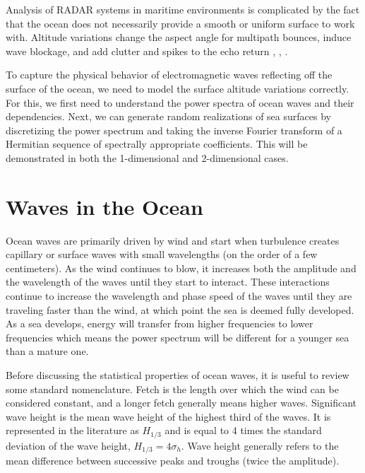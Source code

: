 Analysis of RADAR systems in maritime environments is complicated by the fact that the ocean does not necessarily provide a smooth or uniform surface to work with. Altitude variations change the aspect angle for multipath bounces, induce wave blockage, and add clutter and spikes to the echo return \cite{skolnik_handbook}, \cite{blake_radar}, \cite{nathanson_radar}.

To capture the physical behavior of electromagnetic waves reflecting off the surface of the ocean, we need to model the surface altitude variations correctly. For this, we first need to understand the power spectra of ocean waves and their dependencies. Next, we can generate random realizations of sea surfaces by discretizing the power spectrum and taking the inverse Fourier transform of a Hermitian sequence of spectrally appropriate coefficients. This will be demonstrated in both the 1-dimensional and 2-dimensional cases.

\section {Waves in the Ocean}
Ocean waves are primarily driven by wind and start when turbulence creates capillary or surface waves with small wavelengths (on the order of a few centimeters). As the wind continues to blow, it increases both the amplitude and the wavelength of the waves until they start to interact. These interactions continue to increase the wavelength and phase speed of the waves until they are traveling faster than the wind, at which point the sea is deemed fully developed. As a sea develops, energy will transfer from higher frequencies to lower frequencies which means the power spectrum will be different for a younger sea than a mature one.

Before discussing the statistical properties of ocean waves, it is useful to review some standard nomenclature. Fetch is the length over which the wind can be considered constant, and a longer fetch generally means higher waves. Significant wave height is the mean wave height of the highest third of the waves. It is represented in the literature as $H_{1/3}$ and is equal to 4 times the standard deviation of the wave height, $H_{1/3} = 4\sigma_h$. Wave height generally refers to the mean difference between successive peaks and troughs (twice the amplitude).

